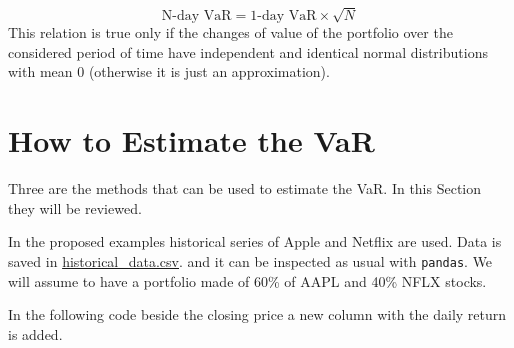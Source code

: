 \begin{equation}
\textrm{N-day VaR} = \textrm{1-day VaR}\times \sqrt{N}
\label{eq:var_horizon}
\end{equation}
This relation is true only if the changes of value of the portfolio over
the considered period of time have independent and identical normal
distributions with mean 0 (otherwise it is just an approximation).

\section{How to Estimate the VaR}\label{how-to-estimate-the-var}

Three are the methods that can be used to estimate the VaR.
In this Section they will be reviewed.

In the proposed examples historical series of Apple and Netflix
are used. Data is saved in \href{}{historical\_data.csv}.
and it can be inspected as usual with \texttt{pandas}.
We will assume to have a portfolio made of 60\% of AAPL and 40\% NFLX stocks.

In the following code beside the closing price a new column with the daily return is added.

